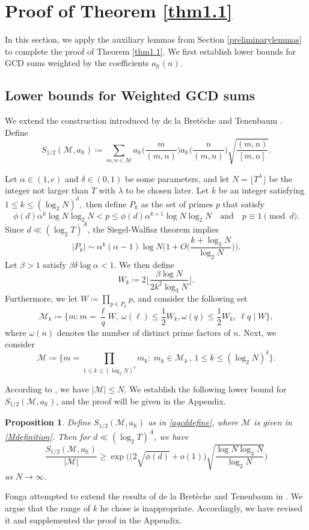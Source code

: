 \documentclass[12pt,reqno]{amsart}
\newtheorem{prop}{Proposition}[section]
\theoremstyle{definition}
\numberwithin{equation}{section}
\newcommand{\mbk}{\mathbb{K}}
\newcommand{\mcm}{\mathcal{M}}
\begin{document}
\section{Proof of Theorem \ref{thm1.1}}
\label{proofofthm1.1}
In this section, we apply the auxiliary lemmas from Section \ref{preliminarylemmas} to complete the proof of Theorem \ref{thm1.1}. We first establish lower bounds for GCD sums weighted by the coefficients $a_\mbk(n)$.
\subsection{Lower bounds for Weighted GCD sums}
We extend the construction introduced by de la Bretèche and Tenenbaum \cite{tenen2019galsum}. Define
\begin{equation}
\label{agcddefine}
S_{1/2}(\mcm,a_\mbk) \coloneqq \sum_{m,n\in \mcm} a_\mbk\Big(\frac{m}{(m,n)}\Big)a_\mbk\Big(\frac{n}{(m,n)}\Big)\sqrt{\frac{(m,n)}{[m,n]}}. 
\end{equation}
\par
Let $\alpha \in (1,e)$ and $\delta \in (0,1)$ be some parameters, and let $N = \lfloor T^{\lambda} \rfloor$ be the integer not larger than $T$ with $\lambda$ to be chosen later. Let $k$ be an integer satisfying $1\le k \le (\log_{2}N)^{\delta},$ then define $P_k$ as the set of primes $p$ that satisfy 
$$
 \phi(d)\alpha^{k}\log N \log_{2}N < p \le  \phi(d)\alpha^{k + 1}\log N \log_{2}N \quad \text{and} \quad p\equiv 1  \pmod{d}.
$$
Since $d \ll (\log_2 T)^A $, the Siegel-Walfisz theorem implies 
$$
 |P_{k}| \sim \alpha^{k}(\alpha - 1)\log N \bigg(1 + O\Big(\frac{k+\log_{3}N}{\log_{2}N}\Big)\bigg).
$$
Let $\beta > 1$ satisfy $\beta \delta \log \alpha < 1$. We then define 
$$
W_k \coloneqq 2\Big\lfloor\frac{\beta\log N}{2k^{2}\log_{3}N}\Big\rfloor.
$$ 
Furthermore, we let $W \coloneqq \prod_{p\in P_{k}}p$, and consider the following set
$$
\mcm_k\coloneqq \Big\{m:m = \frac{\ell}{q}W, \ \omega(\ell)\le \frac{1}{2}W_{k}, \omega(q) \le \frac{1}{2}W_{k}, \ \ell q\mid W\Big\},
$$
where $\omega(n)$ denotes the number of distinct prime factors of $n$. Next, we consider
\begin{equation}
    \label{Mdefinition}
    \mcm\coloneqq\bigg\{m = \prod_{1\leq k\leq (\log_{2}N)^{\delta}}m_{k}: \ m_{k}\in\mcm_k \, , \, 1\leq k\leq (\log_{2}N)^{\delta}\bigg\}.
\end{equation}
\par
According to \cite[Lemma 2.2]{tenen2019galsum}, we have $|\mcm|\le N$. We establish the following lower bound for $S_{1/2}(\mcm,a_\mbk)$, and the proof will be given in the Appendix.
\begin{prop}
    \label{agcdlowerbound}
    Define $S_{1/2}(\mcm,a_\mbk)$ as in \eqref{agcddefine}, where $\mcm$ is given in \eqref{Mdefinition}. Then for $d \ll (\log_2 T)^A$, we have
    $$\frac{S_{1/2}(\mcm, a_\mbk)}{|\mcm|} \ge \exp\bigg(\Big(2\sqrt{\phi(d)} + o(1)\Big)\sqrt{\frac{\log N \log_3 N}{\log_2 N}} \bigg)$$
    as $N \to \infty$.
\end{prop}
Fonga attempted to extend the results of de la Bretèche and Tenenbaum in \cite[Theorem 1.1]{fonga2023extreme}. We argue that the range of $k$ he chose is inappropriate. Accordingly, we have revised it and supplemented the proof in the Appendix.
\end{document}
